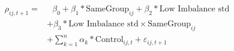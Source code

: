 \textsl{}\begin{equation}
\begin{split}
\rho_{ij,t+1} = & \text{ 	}\beta_0 + \beta_1* \text{SameGroup}_{ij} + \beta_2* \text{Low Imbalance std} \\
&+  \beta_3 * \text{Low Imbalance std} \times \text{SameGroup}_{ij}  \\
  & + \sum_{k=1} ^{n} \alpha_k*\text{Control}_{ij,t} + \varepsilon_{ij,t+1}
\end{split}
\label{model1}
\end{equation}
